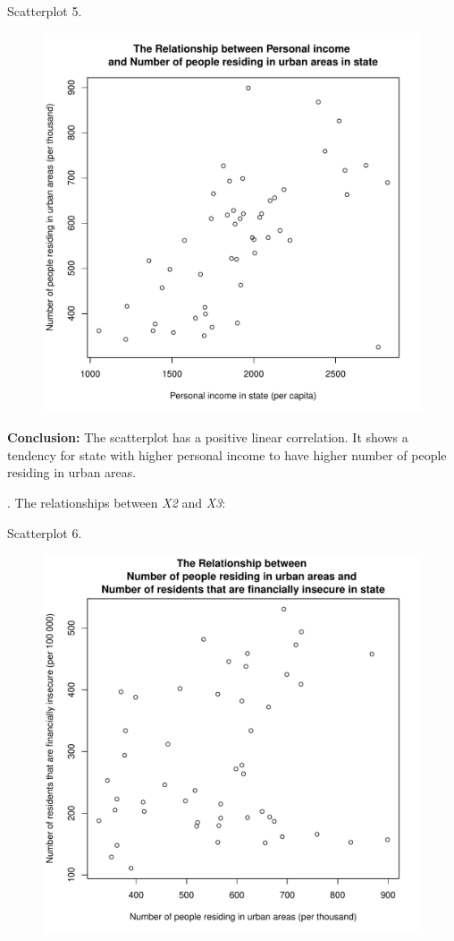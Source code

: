 \documentclass[12pt,letterpaper]{article}
\begin{document}
\noindent Scatterplot 5. 
\begin{figure}[h!]\centering
	\caption{\footnotesize }
	\label{fig:plot_1}
	\includegraphics[width=.75\textwidth]{plot1_5.pdf}
\end{figure}

\noindent \textbf{Conclusion:} The scatterplot has a positive linear correlation. It shows a tendency for state with higher personal income to have higher number of people residing in urban areas. 
\vspace{.5cm}

\newpage
{}. The relationships between \emph{X2} and \emph{X3}:
  

\noindent Scatterplot 6. 
\vspace{.5cm}

\begin{figure}[h!]\centering
	\caption{\footnotesize }
	\label{fig:plot_1}
	\includegraphics[width=.75\textwidth]{plot1_6.pdf}
\end{figure}
\end{document}

